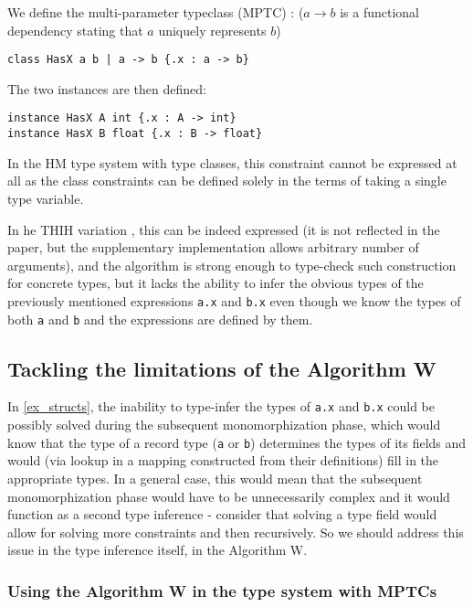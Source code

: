 We define the multi-parameter typeclass (MPTC) : ($a \to b$ is a functional dependency stating that $a$ uniquely represents $b$)

\begin{center}
    \lstinline/class HasX a b | a -> b {.x : a -> b}/
\end{center}

The two instances are then defined:

\begin{lstlisting}
instance HasX A int {.x : A -> int}
instance HasX B float {.x : B -> float}
\end{lstlisting}

In the HM type system with type classes, this constraint cannot be expressed at all as the class constraints can be defined solely in the terms of taking a single type variable.

In he THIH variation \cite{jones1999typing}, this can be indeed expressed (it is not reflected in the paper, but the supplementary implementation allows arbitrary number of arguments), and the algorithm is strong enough to type-check such construction for concrete types, but it lacks the ability to infer the obvious types of the previously mentioned expressions \lstinline{a.x} and \lstinline{b.x} even though we know the types of both \lstinline{a} and \lstinline{b} and the expressions are defined by them.

\subsection{Tackling the limitations of the Algorithm W}

In \cref{ex_structs}, the inability to type-infer the types of \lstinline{a.x} and \lstinline{b.x} could be possibly solved during the subsequent monomorphization phase, which would know that the type of a record type (\lstinline{a} or \lstinline{b}) determines the types of its fields and would (via lookup in a mapping constructed from their definitions) fill in the appropriate types. In a general case, this would mean that the subsequent monomorphization phase would have to be unnecessarily complex and it would function as a second type inference - consider that solving a type field would allow for solving more constraints and then recursively. So we should address this issue in the type inference itself, in the Algorithm W.

\subsubsection{Using the Algorithm W in the type system with MPTCs}

